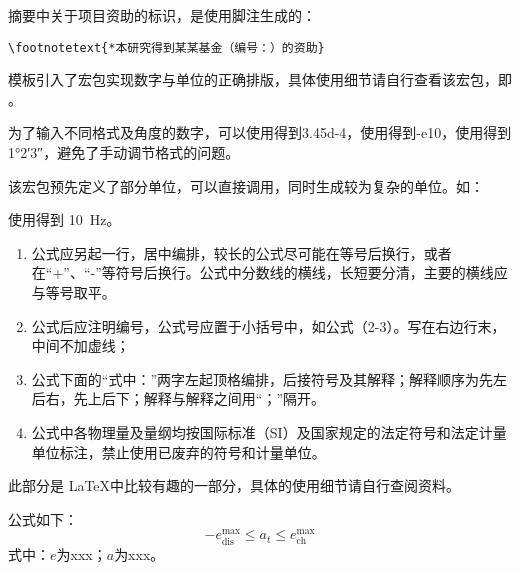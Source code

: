 摘要中关于项目资助的标识，是使用脚注生成的：

\begin{tcolorbox}
  \lstinline|\footnotetext{*本研究得到某某基金（编号：）的资助}|
\end{tcolorbox}


\clearpage



模板引入了宏包实现数字与单位的正确排版，具体使用细节请自行查看该宏包，即 。

为了输入不同格式及角度的数字，可以使用得到\num{3.45d-4}，使用得到\num{-e10}，使用得到\ang{1;2;3}，避免了手动调节格式的问题。

该宏包预先定义了部分单位，可以直接调用，同时生成较为复杂的单位。如：

使用得到 \SI{10}{\hertz}。



\begin{tcolorbox}[colback=red!5!white,colframe=red!75!black]
  \begin{enumerate}[leftmargin=0.5cm]
    \item 公式应另起一行，居中编排，较长的公式尽可能在等号后换行，或者在“+”、“-”等符号后换行。公式中分数线的横线，长短要分清，主要的横线应与等号取平。
    \item 公式后应注明编号，公式号应置于小括号中，如公式（2-3）。写在右边行末，中间不加虚线；
    \item 公式下面的“式中：”两字左起顶格编排，后接符号及其解释；解释顺序为先左后右，先上后下；解释与解释之间用“；”隔开。
    \item 公式中各物理量及量纲均按国际标准（SI）及国家规定的法定符号和法定计量单位标注，禁止使用已废弃的符号和计量单位。
  \end{enumerate}
\end{tcolorbox}

此部分是 \LaTeX 中比较有趣的一部分，具体的使用细节请自行查阅资料。

\begin{texcode}[]{}
  公式如下：
  \begin{equation}
      -e^{\max}_\text{dis} \leq a_t \leq e^{\max}_\text{ch}\label{eqn:c1:mdl:constraint_discharge}
  \end{equation}
  式中：$e$为xxx；$a$为xxx。
\end{texcode}

